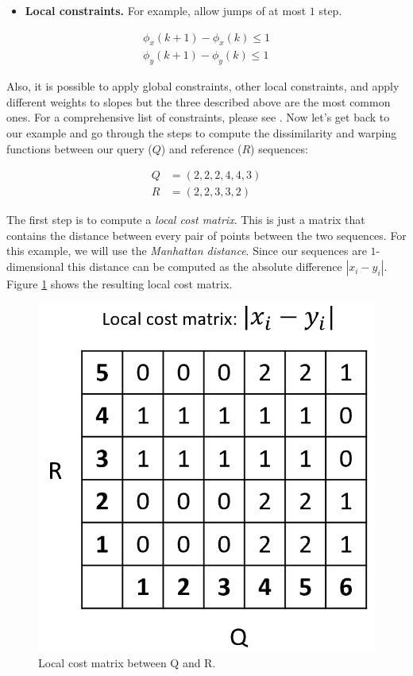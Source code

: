 \documentclass[
  11pt,
]{krantz}
\providecommand{\tightlist}{%
  \setlength{\itemsep}{0pt}\setlength{\parskip}{0pt}}
\begin{document}
\begin{itemize}
\tightlist
\item
  \textbf{Local constraints.} For example, allow jumps of at most \(1\) step.
\end{itemize}

\begin{align*}
\phi_x (k+1) - \phi_x(k) \leq 1 \\
\phi_y (k+1) - \phi_y(k) \leq 1
\end{align*}

Also, it is possible to apply global constraints, other local constraints, and apply different weights to slopes but the three described above are the most common ones. For a comprehensive list of constraints, please see \citep{Rabiner1993}. Now let's get back to our example and go through the steps to compute the dissimilarity and warping functions between our query (\(Q\)) and reference (\(R\)) sequences:

\begin{align*}
Q&=(2,2,2,4,4,3) \\
R&=(2,2,3,3,2)
\end{align*}

The first step is to compute a \emph{local cost matrix}. This is just a matrix that contains the distance between every pair of points between the two sequences. For this example, we will use the \emph{Manhattan distance}. Since our sequences are \(1\)-dimensional this distance can be computed as the absolute difference \(|x_i - y_i|\). Figure \ref{fig:localCost} shows the resulting local cost matrix.

\begin{figure}

{\centering \includegraphics[width=0.5\linewidth]{images/localCostMatrix} 

}

\caption{Local cost matrix between Q and R.}\label{fig:localCost}
\end{figure}
\end{document}
